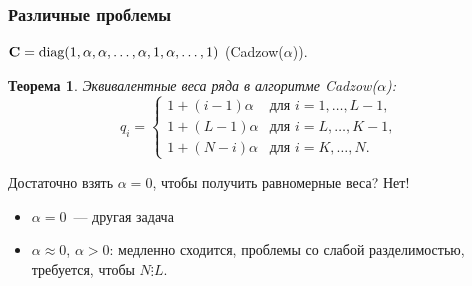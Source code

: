 \documentclass[unicode, notheorems]{beamer}
\newtheorem{theorem}{Теорема}
\begin{document}
\begin{frame}
	\frametitle{Различные проблемы}
	 $\mathbf{C} = \text{diag}(1, \alpha, \alpha, \ldots, \alpha, 1, \alpha, \ldots, 1)$ (Cadzow($\alpha$)).
	\begin{theorem}
		Эквивалентные веса ряда в алгоритме Cadzow($\alpha$):
		\begin{equation*}
		q_i = \begin{cases}
		1 + (i - 1) \alpha & \text{для $i = 1, \ldots, L-1,$}\\
		1 + (L - 1) \alpha & \text{для $i = L, \ldots, K-1,$}\\
		1 + (N - i) \alpha & \text{для $i = K, \ldots, N.$}
		\end{cases}
	    \end{equation*}
	\end{theorem}
	
	Достаточно взять $\alpha = 0$, чтобы получить равномерные веса? Нет! 
	\begin{itemize}
		\item  $\alpha = 0$~--- другая задача
		\item $\alpha \approx 0$, $\alpha > 0$: медленно сходится, проблемы со слабой разделимостью, требуется, чтобы $N \vdots L$.
	\end{itemize}

\end{frame}

\end{document}
